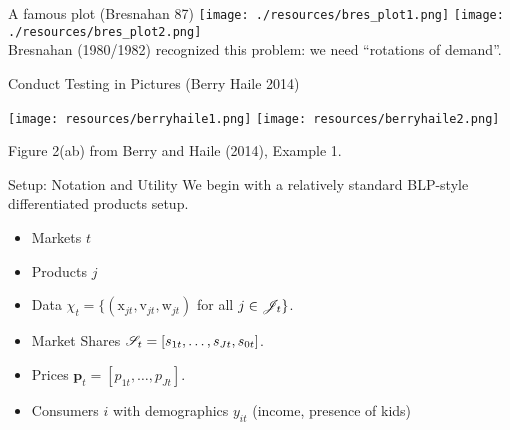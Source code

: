 \documentclass[aspectratio=169,10pt]{beamer}
\begin{document}
\begin{frame}{A famous plot (Bresnahan 87)}
\texttt{[image: ./resources/bres\_plot1.png]}
\texttt{[image: ./resources/bres\_plot2.png]}\\
Bresnahan (1980/1982) recognized this problem: we need ``rotations of demand''.
\end{frame}


\begin{frame}[plain]{Conduct Testing in Pictures (Berry Haile 2014)}
\begin{center}
\texttt{[image: resources/berryhaile1.png]}
\texttt{[image: resources/berryhaile2.png]}
\end{center}
\small{Figure 2(ab) from Berry and Haile (2014), Example 1.}
\end{frame}




\begin{frame}{Setup: Notation and Utility}
We begin with a relatively standard BLP-style differentiated products setup.\\

\begin{itemize}
    \item Markets $t$
    \item Products $j$
    \item Data $\chi_t = \{(\textrm{x}_{jt},\textrm{v}_{jt},\textrm{w}_{jt})$ for all $j \in \mathscr{J}_t\}$.
    \item Market Shares $\mathscr{S}_t = [s_{1t}, \ldots, s_{Jt}, s_{0t}]$.
    \item Prices $\symbf{p}_t = [p_{1t}, \ldots, p_{Jt}]$.
    \item Consumers $i$ with demographics $y_{it}$ (income, presence of kids)
\end{itemize}
\end{frame}
\end{document}
